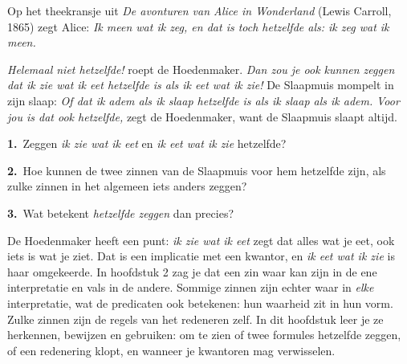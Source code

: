 %


\begin{probleem}
Op het theekransje uit \textit{De avonturen van Alice in Wonderland} (Lewis Carroll, 1865) zegt Alice: \textit{Ik meen wat ik zeg, en dat is toch hetzelfde als: ik zeg wat ik meen.}

\textit{Helemaal niet hetzelfde!} roept de Hoedenmaker. \textit{Dan zou je ook kunnen zeggen dat \textup{ik zie wat ik eet} hetzelfde is als \textup{ik eet wat ik zie}!} De Slaapmuis mompelt in zijn slaap: \textit{Of dat \textup{ik adem als ik slaap} hetzelfde is als \textup{ik slaap als ik adem}.} \textit{Voor jou is dat ook hetzelfde,} zegt de Hoedenmaker, want de Slaapmuis slaapt altijd.

\vspace{1mm}
\textbf{1.}~Zeggen \textit{ik zie wat ik eet} en \textit{ik eet wat ik zie} hetzelfde?

\textbf{2.}~Hoe kunnen de twee zinnen van de Slaapmuis voor hem hetzelfde zijn, als zulke zinnen in het algemeen iets anders zeggen?

\textbf{3.}~Wat betekent \textit{hetzelfde zeggen} dan precies?
\end{probleem}


De Hoedenmaker heeft een punt: \textit{ik zie wat ik eet} zegt dat alles wat je eet, ook iets is wat je ziet. Dat is een implicatie met een kwantor, en \textit{ik eet wat ik zie} is haar omgekeerde. In hoofdstuk 2 zag je dat een zin waar kan zijn in de ene interpretatie en vals in de andere. Sommige zinnen zijn echter waar in \textit{elke} interpretatie, wat de predicaten ook betekenen: hun waarheid zit in hun vorm. Zulke zinnen zijn de regels van het redeneren zelf. In dit hoofdstuk leer je ze herkennen, bewijzen en gebruiken: om te zien of twee formules hetzelfde zeggen, of een redenering klopt, en wanneer je kwantoren mag verwisselen.

